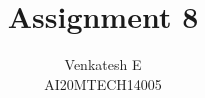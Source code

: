 \documentclass[journal,12pt,twocolumn]{IEEEtran}
\begin{document}
\makeatletter
{}
\makeatother
\let\StandardTheFigure\thefigure
\let\vec\mathbf
\renewcommand{\thefigure}{\theproblem}
\def\putbox#1#2#3{\makebox[0in][l]{\makebox[#1][l]{}\raisebox{\baselineskip}[0in][0in]{\raisebox{#2}[0in][0in]{#3}}}}
     \def\rightbox#1{\makebox[0in][r]{#1}}
     \def\centbox#1{\makebox[0in]{#1}}
     \def\topbox#1{\raisebox{-\baselineskip}[0in][0in]{#1}}
     \def\midbox#1{\raisebox{-0.5\baselineskip}[0in][0in]{#1}}
\vspace{3cm}
\title{Assignment 8}
\author{Venkatesh E\\AI20MTECH14005}
%
%
%
% 
%
\end{document}
